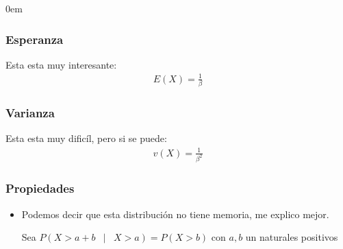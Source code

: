 \documentclass[12pt, fleqn]{report}                             %
\newenvironment{SmallIndentation}[1][0.75em]                    %
        {\begin{adjustwidth}{#1}{}\begin{footnotesize}}             %
        {\end{footnotesize}\end{adjustwidth}}                       %
\DeclareMathOperator \Space     {\quad}                         %
\DeclareMathOperator \MiniSpace {\;}                            %
\newcommand \Such           {\MiniSpace | \MiniSpace}           %
\theoremstyle{break}                                            %
\begin{document}
\begin{multicols}{2}
\begin{SmallIndentation}[0em]
                    \subsubsection{Esperanza}

                        Esta esta muy interesante:
                        \begin{align*}
                            E(X) = \frac{1}{\beta}                    
                        \end{align*}

                    \subsubsection{Varianza}

                        Esta esta muy dificíl, pero si se puede:
                        \begin{align*}
                            v(X) = \frac{1}{\beta^2}
                        \end{align*}


                    \subsubsection{Propiedades}

                        \begin{itemize}
                            
                            \item 
                                Podemos decir que esta distribución no tiene memoria, me explico
                                mejor.

                                Sea $P(X > a + b \Such X > a) = P(X > b)$ con $a, b$ un naturales positivos


\end{itemize}
\end{SmallIndentation}
\end{multicols}
\end{document}
